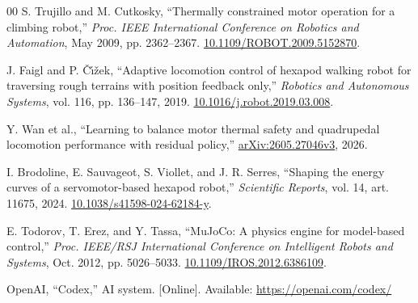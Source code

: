 \documentclass{ieeeaccess}
\begin{document}
\clearpage
\begin{thebibliography}{00}
S. Trujillo and M. Cutkosky, \textquotedblleft{}Thermally constrained motor operation for a climbing robot,\textquotedblright{} \emph{Proc. IEEE International Conference on Robotics and Automation}, May 2009, pp. 2362--2367. \href{https://doi.org/10.1109/ROBOT.2009.5152870}{10.1109/ROBOT.2009.5152870}.

J. Faigl and P. \v{C}\'{\i}\v{z}ek, \textquotedblleft{}Adaptive locomotion control of hexapod walking robot for traversing rough terrains with position feedback only,\textquotedblright{} \emph{Robotics and Autonomous Systems}, vol. 116, pp. 136--147, 2019. \href{https://doi.org/10.1016/j.robot.2019.03.008}{10.1016/j.robot.2019.03.008}.

Y. Wan et al., \textquotedblleft{}Learning to balance motor thermal safety and quadrupedal locomotion performance with residual policy,\textquotedblright{} \href{https://arxiv.org/abs/2605.27046v3}{arXiv:2605.27046v3}, 2026.

I. Brodoline, E. Sauvageot, S. Viollet, and J. R. Serres, \textquotedblleft{}Shaping the energy curves of a servomotor-based hexapod robot,\textquotedblright{} \emph{Scientific Reports}, vol. 14, art. 11675, 2024. \href{https://doi.org/10.1038/s41598-024-62184-y}{10.1038/s41598-024-62184-y}.

E. Todorov, T. Erez, and Y. Tassa, \textquotedblleft{}MuJoCo: A physics engine for model-based control,\textquotedblright{} \emph{Proc. IEEE/RSJ International Conference on Intelligent Robots and Systems}, Oct. 2012, pp. 5026--5033. \href{https://doi.org/10.1109/IROS.2012.6386109}{10.1109/IROS.2012.6386109}.

OpenAI, \textquotedblleft{}Codex,\textquotedblright{} AI system. [Online]. Available: \url{https://openai.com/codex/}

\end{thebibliography}

\EOD
\end{document}
